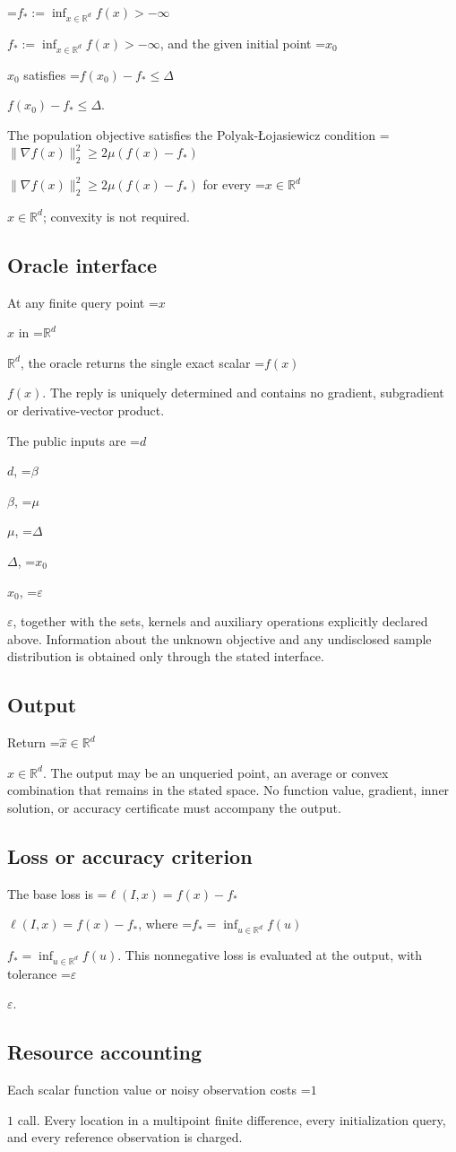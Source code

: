 \documentclass[10pt,a4paper]{article}
\newcommand{\AtlasMath}[1]{\par\begingroup\centering\setbox0=\hbox{$\displaystyle #1$}\ifdim\wd0>1.4\linewidth\typeout{ATLAS WIDE FORMULA: \the\wd0}\fi\ifdim\wd0>\linewidth\resizebox{\linewidth}{!}{\box0}\else\box0\fi\par\endgroup}
\newcommand{\AtlasInlineMath}[1]{\begingroup\setbox0=\hbox{$#1$}\ifdim\wd0>.4\linewidth\endgroup\AtlasMath{#1}\else\endgroup$#1$\fi}
\begin{document}
\AtlasInlineMath{f_*:=\inf_{x\in\mathbb{R}^d}f(x)>-\infty}, and the given initial point \AtlasInlineMath{x_0} satisfies \AtlasInlineMath{f(x_0)-f_*\le\Delta}.

The population objective satisfies the Polyak-Łojasiewicz condition \AtlasInlineMath{\|\nabla f(x)\|_2^2\ge2\mu(f(x)-f_*)} for every \AtlasInlineMath{x\in\mathbb{R}^d}; convexity is not required.

\subsection{Oracle interface}
At any finite query point \AtlasInlineMath{x} in \AtlasInlineMath{\mathbb{R}^d}, the oracle returns the single exact scalar \AtlasInlineMath{f(x)}. The reply is uniquely determined and contains no gradient, subgradient or derivative-vector product.

The public inputs are \AtlasInlineMath{d}, \AtlasInlineMath{\beta}, \AtlasInlineMath{\mu}, \AtlasInlineMath{\Delta}, \AtlasInlineMath{x_0}, \AtlasInlineMath{\varepsilon}, together with the sets, kernels and auxiliary operations explicitly declared above. Information about the unknown objective and any undisclosed sample distribution is obtained only through the stated interface.

\subsection{Output}
Return \AtlasInlineMath{\widehat{x}\in \mathbb{R}^d}. The output may be an unqueried point, an average or convex combination that remains in the stated space. No function value, gradient, inner solution, or accuracy certificate must accompany the output.

\subsection{Loss or accuracy criterion}
The base loss is \AtlasInlineMath{\ell(I,x)=f(x)-f_*}, where \AtlasInlineMath{f_*=\inf_{u\in \mathbb{R}^d}f(u)}. This nonnegative loss is evaluated at the output, with tolerance \AtlasInlineMath{\varepsilon}.

\subsection{Resource accounting}
Each scalar function value or noisy observation costs \AtlasInlineMath{1} call. Every location in a multipoint finite difference, every initialization query, and every reference observation is charged.
\end{document}
